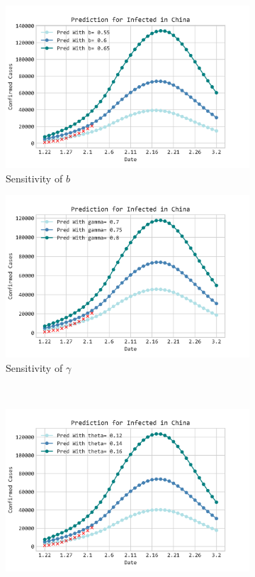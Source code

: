 \documentclass[12pt]{mcmthesis}
\begin{document}
\begin{figure}[H]
    \centering
    \begin{subfigure}[t]{0.45\textwidth}
        \includegraphics[width=1.0\textwidth]{053/figure/Sens_b.png}
        \caption{Sensitivity of $b$}
        \label{fig:Sens_b}
    \end{subfigure}
    \begin{subfigure}[t]{0.45\textwidth}
        \includegraphics[width=1.0\textwidth]{053/figure/Sens_gamma.png}
        \caption{Sensitivity of $\gamma$}
        \label{fig:Sens_gama}
    \end{subfigure}
    \\
    \begin{subfigure}[t]{0.45\textwidth}
        \includegraphics[width=1.0\textwidth]{053/figure/Sens_theta.png}

\end{subfigure}
\end{figure}
\end{document}

